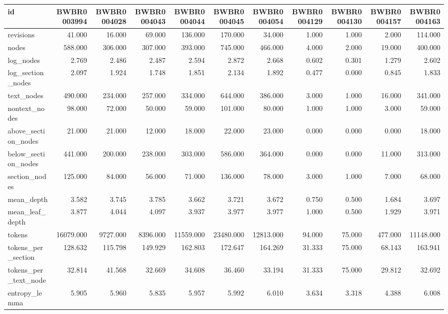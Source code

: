 \begin{tabular}{lrrrrrrrrrr}
\toprule
id & BWBR0003994 & BWBR0004028 & BWBR0004043 & BWBR0004044 & BWBR0004045 & BWBR0004054 & BWBR0004129 & BWBR0004130 & BWBR0004157 & BWBR0004163 \\
\midrule
revisions & 41.000 & 16.000 & 69.000 & 136.000 & 170.000 & 34.000 & 1.000 & 1.000 & 2.000 & 114.000 \\
\cline{1-11}
nodes & 588.000 & 306.000 & 307.000 & 393.000 & 745.000 & 466.000 & 4.000 & 2.000 & 19.000 & 400.000 \\
\cline{1-11}
log\_nodes & 2.769 & 2.486 & 2.487 & 2.594 & 2.872 & 2.668 & 0.602 & 0.301 & 1.279 & 2.602 \\
\cline{1-11}
log\_section\_nodes & 2.097 & 1.924 & 1.748 & 1.851 & 2.134 & 1.892 & 0.477 & 0.000 & 0.845 & 1.833 \\
\cline{1-11}
text\_nodes & 490.000 & 234.000 & 257.000 & 334.000 & 644.000 & 386.000 & 3.000 & 1.000 & 16.000 & 341.000 \\
\cline{1-11}
nontext\_nodes & 98.000 & 72.000 & 50.000 & 59.000 & 101.000 & 80.000 & 1.000 & 1.000 & 3.000 & 59.000 \\
\cline{1-11}
above\_section\_nodes & 21.000 & 21.000 & 12.000 & 18.000 & 22.000 & 23.000 & 0.000 & 0.000 & 0.000 & 18.000 \\
\cline{1-11}
below\_section\_nodes & 441.000 & 200.000 & 238.000 & 303.000 & 586.000 & 364.000 & 0.000 & 0.000 & 11.000 & 313.000 \\
\cline{1-11}
section\_nodes & 125.000 & 84.000 & 56.000 & 71.000 & 136.000 & 78.000 & 3.000 & 1.000 & 7.000 & 68.000 \\
\cline{1-11}
mean\_depth & 3.582 & 3.745 & 3.785 & 3.662 & 3.721 & 3.672 & 0.750 & 0.500 & 1.684 & 3.697 \\
\cline{1-11}
mean\_leaf\_depth & 3.877 & 4.044 & 4.097 & 3.937 & 3.977 & 3.977 & 1.000 & 0.500 & 1.929 & 3.971 \\
\cline{1-11}
tokens & 16079.000 & 9727.000 & 8396.000 & 11559.000 & 23480.000 & 12813.000 & 94.000 & 75.000 & 477.000 & 11148.000 \\
\cline{1-11}
tokens\_per\_section & 128.632 & 115.798 & 149.929 & 162.803 & 172.647 & 164.269 & 31.333 & 75.000 & 68.143 & 163.941 \\
\cline{1-11}
tokens\_per\_text\_node & 32.814 & 41.568 & 32.669 & 34.608 & 36.460 & 33.194 & 31.333 & 75.000 & 29.812 & 32.692 \\
\cline{1-11}
entropy\_lemma & 5.905 & 5.960 & 5.835 & 5.957 & 5.992 & 6.010 & 3.634 & 3.318 & 4.388 & 6.008 \\

\end{tabular}
